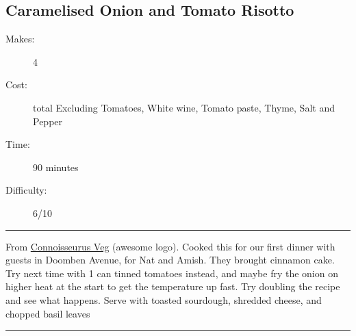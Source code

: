 \documentclass[]{article}
\begin{document}
\subsection*{\center\huge Caramelised Onion and Tomato Risotto}
\begin{description}
\item[Makes:] 4 
\item[Cost:]  total Excluding Tomatoes, White wine, Tomato paste, Thyme, Salt and Pepper
\item[Time:] 90 minutes
\item[Difficulty:] 6/10
\end{description}
\vspace{0.2cm}\hrule\vspace{0.5cm}
\begin{adjustwidth}{0.5 cm}{0.5 cm}

From \href{https://www.connoisseurusveg.com/tomato-risotto/}{Connoisseurus Veg} (awesome logo). Cooked this for our first dinner with guests in Doomben Avenue, for Nat and Amish. They brought cinnamon cake. Try next time with 1 can tinned tomatoes instead, and maybe fry the onion on higher heat at the start to get the temperature up fast. Try doubling the recipe and see what happens. Serve with toasted sourdough, shredded cheese, and chopped basil leaves \hfill{}\color{black}

\end{adjustwidth}
\vspace{0.5cm}\hrule
\end{document}
